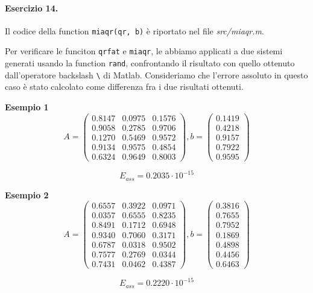 \paragraph{Esercizio 14.} Il codice della function \verb|miaqr(qr, b)| è riportato nel file \emph{src/miaqr.m}.

Per verificare le funciton \verb|qrfat| e \verb|miaqr|, le abbiamo applicati a due sistemi generati usando la function \verb|rand|, confrontando il risultato con quello ottenuto dall'operatore backslash \verb|\| di Matlab. Consideriamo che l'errore assoluto in questo caso è stato calcolato come differenza fra i due risultati ottenuti.

\textbf{Esempio 1}
\[
A = \begin{pmatrix}
0.8147 & 0.0975 & 0.1576\\
0.9058 & 0.2785 & 0.9706\\
0.1270 & 0.5469 & 0.9572\\
0.9134 & 0.9575 & 0.4854\\
0.6324 & 0.9649 & 0.8003
\end{pmatrix}, b = \begin{pmatrix}
0.1419\\
0.4218\\
0.9157\\
0.7922\\
0.9595
\end{pmatrix}
\]

\[
E_{ass} = 0.2035 \cdot 10^{-15}
\]

\textbf{Esempio 2}
\[
A = \begin{pmatrix}
0.6557 & 0.3922 & 0.0971\\
0.0357 & 0.6555 & 0.8235\\
0.8491 & 0.1712 & 0.6948\\
0.9340 & 0.7060 & 0.3171\\
0.6787 & 0.0318 & 0.9502\\
0.7577 & 0.2769 & 0.0344\\
0.7431 & 0.0462 & 0.4387
\end{pmatrix}, b = \begin{pmatrix}
0.3816\\
0.7655\\
0.7952\\
0.1869\\
0.4898\\
0.4456\\
0.6463
\end{pmatrix}
\]

\[
E_{ass} = 0.2220 \cdot 10^{-15}
\]